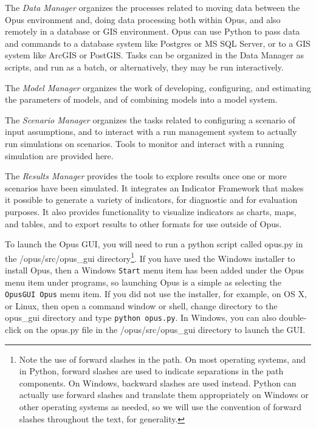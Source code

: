 \squishlist
\item The \emph{Data Manager} organizes the processes related to moving data between the Opus environment and, doing data processing both within Opus, and also remotely in a database or GIS environment.  Opus can use Python to pass data and commands to a database system like Postgres or MS SQL Server, or to a GIS system like ArcGIS or PostGIS.  Tasks can be organized in the Data Manager as scripts, and run as a batch, or alternatively, they may be run interactively.
\item The \emph{Model Manager} organizes the work of developing, configuring, and estimating the parameters of models, and of combining models into a model system.
\item The \emph{Scenario Manager} organizes the tasks related to configuring a scenario of input assumptions, and to interact with a run management system to actually run simulations on scenarios.  Tools to monitor and interact with a running simulation are provided here.
\item The \emph{Results Manager} provides the tools to explore results once one or more scenarios have been simulated.  It integrates an Indicator Framework that makes it possible to generate a variety of indicators, for diagnostic and for evaluation purposes.  It also provides functionality to visualize indicators as charts, maps, and tables, and to export results to other formats for use outside of Opus.
\squishend


To launch the Opus GUI, you will need to run a python script
called opus.py in the /opus/src/opus\_gui directory\footnote{Note the
use of forward slashes in the path.  On most operating systems, and in
Python, forward slashes are used to indicate separations in the path
components.  On Windows, backward slashes are used instead.  Python can
actually use forward slashes and translate them appropriately on
Windows or other operating systems as needed, so we will use the
convention of forward slashes throughout the text, for generality.}. 
If you have used the Windows installer to install Opus, then a Windows
\texttt{Start} menu item has been added under the Opus menu item
under programs, so launching Opus is a simple as selecting the
\texttt{OpusGUI Opus} menu item.  If you did not use the installer,
for example, on OS X, or Linux, then open a command window or shell, change directory to
the opus\_gui directory and type \texttt{python opus.py}.  In Windows,
you can also double-click on the opus.py file in the
/opus/src/opus\_gui directory to launch the GUI.\\

